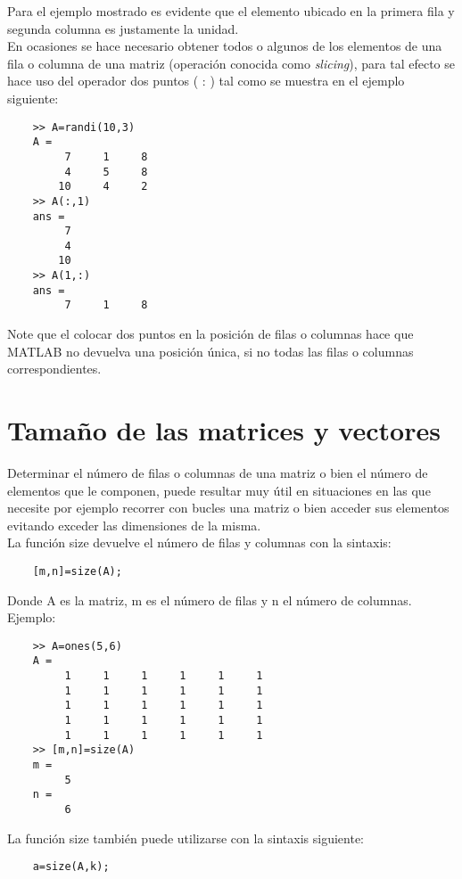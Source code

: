 Para el ejemplo mostrado es evidente que el elemento ubicado en la primera fila y 
segunda columna es justamente la unidad.\\

En ocasiones se hace necesario obtener todos o algunos de los elementos de una fila 
o columna de una matriz (operación conocida como \textit{slicing}), para tal efecto se hace 
uso del operador dos puntos ( : ) tal como se muestra en el ejemplo siguiente:

\begin{verbatim}
	>> A=randi(10,3)
	A =
	     7     1     8
	     4     5     8
	    10     4     2
	>> A(:,1)
	ans =
	     7
	     4
	    10
	>> A(1,:)
	ans =
	     7     1     8
\end{verbatim}

Note que el colocar dos puntos en la posición de filas o columnas hace que MATLAB 
no devuelva una posición única, si no todas las filas o columnas correspondientes.


\section{Tamaño de las matrices y vectores}

Determinar el número de filas o columnas de una matriz o bien el número de elementos 
que le componen, puede resultar muy útil en situaciones en las que necesite por ejemplo 
recorrer con bucles una matriz o bien acceder sus elementos evitando exceder las 
dimensiones de la misma.\\

La función size devuelve el número de filas y columnas con la sintaxis:

\begin{verbatim}
	[m,n]=size(A);
\end{verbatim}

Donde A es la matriz, m es el número de filas y n el número de columnas. Ejemplo:

\begin{verbatim}
	>> A=ones(5,6)
	A =
	     1     1     1     1     1     1
	     1     1     1     1     1     1
	     1     1     1     1     1     1
	     1     1     1     1     1     1
	     1     1     1     1     1     1
	>> [m,n]=size(A)
	m =
	     5
	n =
	     6
\end{verbatim}

La función size también puede utilizarse con la sintaxis siguiente:

\begin{verbatim}
	a=size(A,k);
\end{verbatim}


